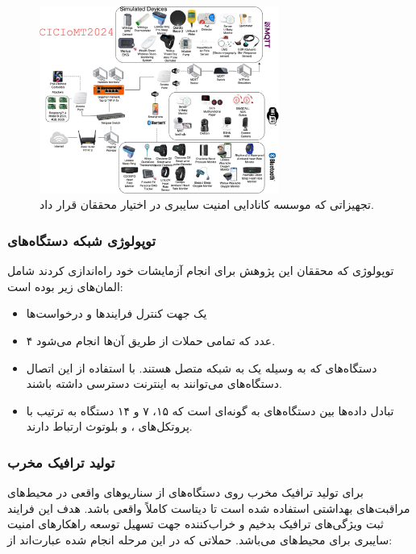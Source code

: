 \begin{figure}[H]
  \centering
  \includegraphics[width=0.7\textwidth]{./figures/fig-3.jpg}
  \caption{تجهیزاتی که موسسه کانادایی امنیت سایبری در اختیار محققان قرار داد.}
  \label{fig:cicIotLab}
\end{figure}

\subsubsection{توپولوژی شبکه دستگاه‌های }

توپولوژی که محققان این پژوهش برای انجام آزمایشات خود راه‌اندازی کردند شامل
المان‌های زیر بوده است:

\begin{itemize}
    \item یک  جهت کنترل فرایند‌ها و درخواست‌ها
    \item ۴ عدد  که تمامی حملات از طریق آن‌ها انجام می‌شود.
    \item دستگاه‌های  که به وسیله یک  به شبکه متصل
    هستند. با استفاده از این اتصال دستگاه‌های  می‌توانند به اینترنت
    دسترسی داشته باشند.
    \item تبادل داده‌ها بین دستگاه‌های  به گونه‌ای است که ۱۵، ۷ و ۱۴
    دستگاه به ترتیب با پروتکل‌های ،  و بلوتوث ارتباط دارند.
\end{itemize}

\subsubsection{تولید ترافیک مخرب}

برای تولید ترافیک مخرب روی دستگاه‌های  از سناریو‌های واقعی در محیط‌های
مراقبت‌های بهداشتی استفاده شده است تا دیتاست کاملاً واقعی باشد. هدف این فرایند
ثبت ویژگی‌های ترافیک بدخیم و خراب‌کننده جهت تسهیل توسعه راهکار‌های امنیت سایبری
برای محیط‌های  می‌باشد. حملاتی که در این مرحله انجام شده عبارت‌اند از:


